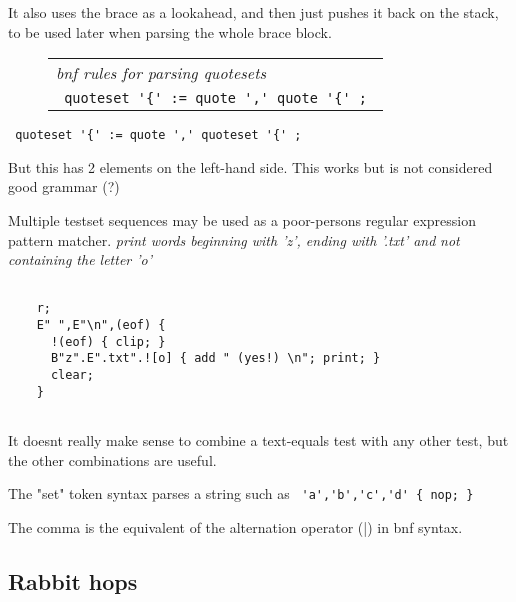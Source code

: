 \documentclass[a4paper,12pt]{article}
\begin{document}
  It also uses the brace as a lookahead, and then just pushes it
  back on the stack, to be used later when parsing the whole brace block.
 \begin{figure}
 \begin{tabular}{ l }
 \emph{ bnf rules for parsing quotesets } \\ 
 \verb| quoteset '{' := quote ',' quote '{' ; |
 \end{tabular} 
 \end{figure} 
 \verb| quoteset '{' := quote ',' quoteset '{' ; |


  But this has 2 elements on the left-hand side. This works but is
  not considered good grammar (?)

  Multiple testset sequences may be used as a poor-persons
  regular expression pattern matcher.
 \emph{ print words beginning with 'z', ending with '.txt' and }
 \emph{ not containing the letter 'o' } 
 \begin{lstlisting}[breaklines] 

    r;
    E" ",E"\n",(eof) {
      !(eof) { clip; } 
      B"z".E".txt".![o] { add " (yes!) \n"; print; }
      clear;
    }
  
 \end{lstlisting} 


  It doesnt really make sense to combine a text-equals test with
  any other test, but the other combinations are useful.

  The "set" token syntax parses a string such as 
 \verb| 'a','b','c','d' { nop; } |


 The comma is the equivalent of the alternation operator (|) in
 bnf syntax.

\subsection{Rabbit hops}
\end{document}
